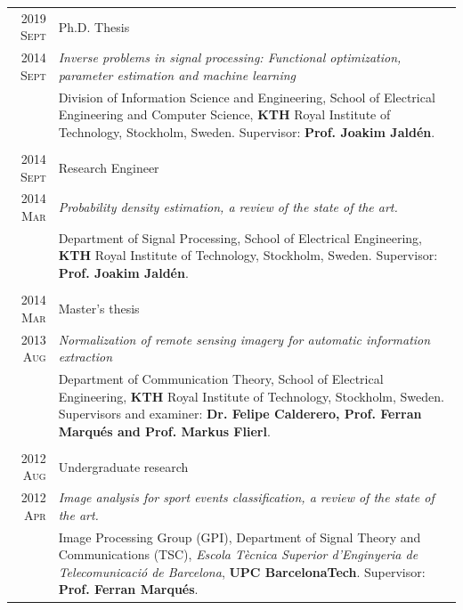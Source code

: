 \documentclass[a4paper,10pt]{article}
\begin{document}
    \begin{tabular}{r|p{13cm}}
    
      \textsc{2019 Sept} 	& Ph.D. Thesis \\
      \textsc{2014 Sept} 	& \emph{Inverse problems in signal processing: Functional optimization, parameter estimation and machine learning} \\
				& \footnotesize{ Division of Information Science and Engineering, School of Electrical Engineering and Computer Science,
				  \textbf{KTH} Royal Institute of Technology, Stockholm, Sweden. Supervisor: \textbf{Prof. Joakim Jald\'{e}n}.} \\
      \multicolumn{2}{c}{} \\

      \textsc{2014 Sept} 	& Research Engineer \\
      \textsc{2014 Mar} 	& \emph{Probability density estimation, a review of the state of the art.} \\ 
				& \footnotesize{Department of Signal Processing, School of Electrical Engineering,
				  \textbf{KTH} Royal Institute of Technology, Stockholm, Sweden. Supervisor: \textbf{Prof. Joakim Jald\'{e}n}.} \\
      \multicolumn{2}{c}{} \\

      \textsc{2014 Mar} 	& Master's thesis \\
      \textsc{2013 Aug} 	& \emph{ Normalization of remote sensing imagery for automatic information extraction } \\ 
				& \footnotesize{Department of Communication Theory, School of Electrical Engineering,
				  \textbf{KTH} Royal Institute of Technology, Stockholm, Sweden. Supervisors and examiner: \textbf{Dr. Felipe Calderero, Prof. Ferran Marqu\'{e}s and Prof. Markus Flierl}.} \\
      \multicolumn{2}{c}{} \\


      \textsc{2012 Aug} 	& Undergraduate research \\
      \textsc{2012 Apr} 	& \emph{Image analysis for sport events classification, a review of the state of the art.} \\ 
				& \footnotesize{Image Processing Group (GPI), Department of Signal Theory and 
				  Communications (TSC), \emph{Escola T\`{e}cnica Superior d'Enginyeria de Telecomunicaci\'{o} 
				  de Barcelona}, \textbf{UPC BarcelonaTech}. Supervisor: \textbf{Prof. Ferran Marqu\'{e}s}.} \\

    \end{tabular}
\end{document}
